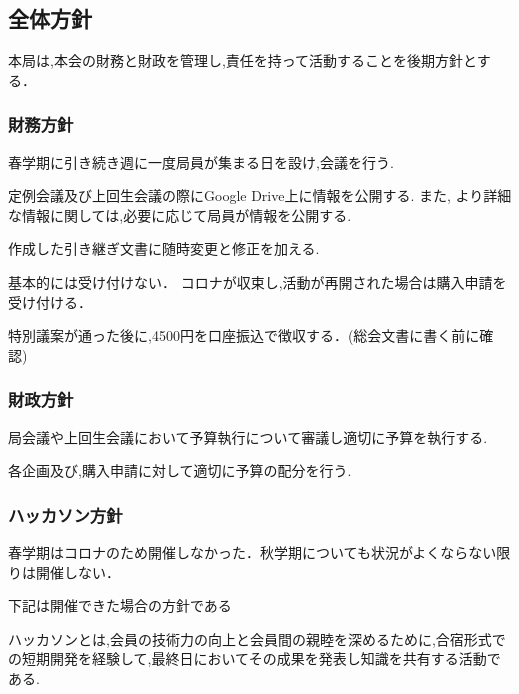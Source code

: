 \subsection*{全体方針}



本局は,本会の財務と財政を管理し,責任を持って活動することを後期方針とする．


\subsubsection*{財務方針}

春学期に引き続き週に一度局員が集まる日を設け,会議を行う.

定例会議及び上回生会議の際にGoogle Drive上に情報を公開する.
また, より詳細な情報に関しては,必要に応じて局員が情報を公開する.

作成した引き継ぎ文書に随時変更と修正を加える.

基本的には受け付けない．
コロナが収束し,活動が再開された場合は購入申請を受け付ける．

特別議案が通った後に,4500円を口座振込で徴収する．(総会文書に書く前に確認)


\subsubsection*{財政方針}

局会議や上回生会議において予算執行について審議し適切に予算を執行する.

各企画及び,購入申請に対して適切に予算の配分を行う.


\subsubsection*{ハッカソン方針}
春学期はコロナのため開催しなかった．秋学期についても状況がよくならない限りは開催しない．

下記は開催できた場合の方針である

ハッカソンとは,会員の技術力の向上と会員間の親睦を深めるために,合宿形式での短期開発を経験して,最終日においてその成果を発表し知識を共有する活動である.

